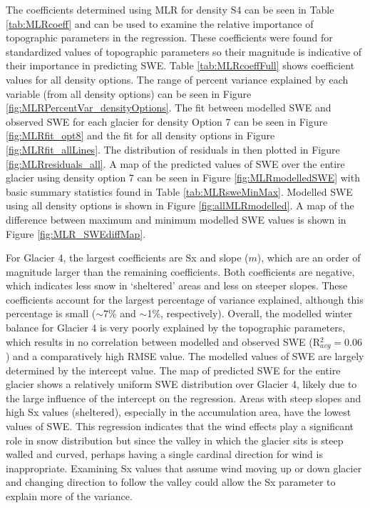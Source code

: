 \documentclass[12pt]{article}
\begin{document}
The coefficients determined using MLR for density S4 can be seen in Table \ref{tab:MLRcoeff} and can be used to examine the relative importance of topographic parameters in the regression. These coefficients were found for standardized values of topographic parameters so their magnitude is indicative of their importance in predicting SWE. Table \ref{tab:MLRcoeffFull} shows coefficient values for all density options. The range of percent variance explained by each variable (from all density options) can be seen in Figure \ref{fig:MLRPercentVar_densityOptions}. The fit between modelled SWE and observed SWE for each glacier for density Option 7 can be seen in Figure \ref{fig:MLRfit_opt8} and the fit for all density options in Figure \ref{fig:MLRfit_allLines}. The distribution of residuals in then plotted in Figure \ref{fig:MLRresiduals_all}. A map of the predicted values of SWE over the entire glacier using density option 7 can be seen in Figure \ref{fig:MLRmodelledSWE} with basic summary statistics found in Table \ref{tab:MLRsweMinMax}. Modelled SWE using all density options is shown in Figure \ref{fig:allMLRmodelled}. A map of the difference between maximum and minimum modelled SWE values is shown in Figure \ref{fig:MLR_SWEdiffMap}.

For Glacier 4, the largest coefficients are Sx and slope ($m$), which are an order of magnitude larger than the remaining coefficients. Both coefficients are negative, which indicates less snow in `sheltered' areas and less on steeper slopes. These coefficients account for the largest percentage of variance explained, although this percentage is small ($\sim$7\% and $\sim$1\%, respectively). Overall, the modelled winter balance for Glacier 4 is very poorly explained by the topographic parameters, which results in no correlation between modelled and observed SWE (R$^2_{avg}=0.06$) and a comparatively high RMSE value. The modelled values of SWE are largely determined by the intercept value. The map of predicted SWE for the entire glacier shows a relatively uniform SWE distribution over Glacier 4, likely due to the large influence of the intercept on the regression. Areas with steep slopes and high Sx values (sheltered), especially in the accumulation area, have the lowest values of SWE. This regression indicates that the wind effects play a significant role in snow distribution but since the valley in which the glacier sits is steep walled and curved, perhaps having a single cardinal direction for wind is inappropriate. Examining Sx values that assume wind moving up or down glacier and changing direction to follow the valley could allow the Sx parameter to explain more of the variance. 
\end{document}
